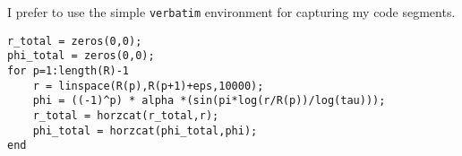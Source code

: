 \documentclass{nusthesis}
\begin{document}
I prefer to use the simple \texttt{verbatim} environment for capturing my code segments.

\begin{Verbatim}[frame=single]
r_total = zeros(0,0);
phi_total = zeros(0,0);
for p=1:length(R)-1
    r = linspace(R(p),R(p+1)+eps,10000);
    phi = ((-1)^p) * alpha *(sin(pi*log(r/R(p))/log(tau)));
    r_total = horzcat(r_total,r);
    phi_total = horzcat(phi_total,phi);
end
\end{Verbatim}





\backmatter
\end{document}
